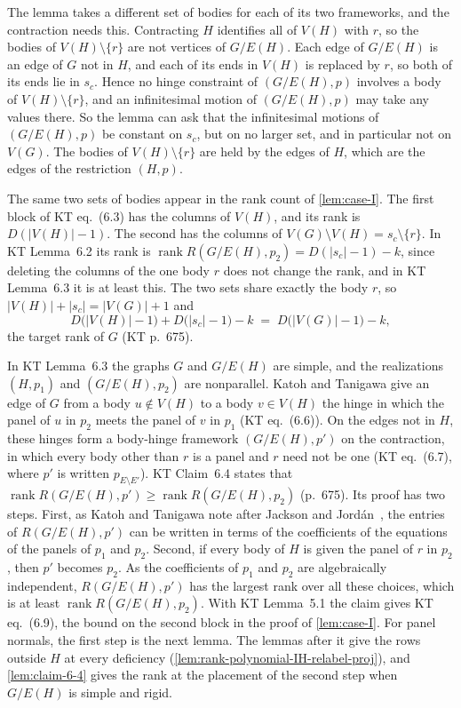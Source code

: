 The lemma takes a different set of bodies for each of its two
frameworks, and the contraction needs this. Contracting $H$ identifies
all of $V(H)$ with $r$, so the bodies of $V(H) \setminus \{r\}$ are not
vertices of $G/E(H)$. Each edge of $G/E(H)$ is an edge of $G$ not in
$H$, and each of its ends in $V(H)$ is replaced by $r$, so both of its
ends lie in $s_c$. Hence no hinge constraint of $(G/E(H), p)$ involves a
body of $V(H) \setminus \{r\}$, and an infinitesimal motion of
$(G/E(H), p)$ may take any values there. So the lemma can ask that the
infinitesimal motions of $(G/E(H), p)$ be constant on $s_c$, but on no
larger set, and in particular not on $V(G)$. The bodies of
$V(H) \setminus \{r\}$ are held by the edges of $H$, which are the
edges of the restriction $(H, p)$.

The same two sets of bodies appear in the rank count of
\cref{lem:case-I}. The first block of KT eq.~(6.3) has the columns of
$V(H)$, and its rank is $D(|V(H)| - 1)$. The second has the columns of
$V(G) \setminus V(H) = s_c \setminus \{r\}$. In KT Lemma~6.2 its rank
is $\operatorname{rank} R(G/E(H), p_2) = D(|s_c| - 1) - k$, since
deleting the columns of the one body $r$ does not change the rank, and
in KT Lemma~6.3 it is at least this. The two sets share exactly the body
$r$, so
$|V(H)| + |s_c| = |V(G)| + 1$ and
\[
  D\bigl(|V(H)| - 1\bigr) + D\bigl(|s_c| - 1\bigr) - k
  \;=\; D\bigl(|V(G)| - 1\bigr) - k,
\]
the target rank of $G$ (KT p.~675).

In KT Lemma~6.3 the graphs $G$ and $G/E(H)$ are simple, and the
realizations $(H, p_1)$ and $(G/E(H), p_2)$ are nonparallel. Katoh and
Tanigawa give an edge of $G$ from a body $u \notin V(H)$ to a body
$v \in V(H)$ the hinge in which the panel of $u$ in $p_2$ meets the panel
of $v$ in $p_1$ (KT eq.~(6.6)). On the edges not in $H$, these hinges
form a body-hinge framework $(G/E(H), p')$ on the contraction, in which
every body other than $r$ is a panel and $r$ need not be one (KT
eq.~(6.7), where $p'$ is written $p_{E \setminus E'}$). KT Claim~6.4
states that
$\operatorname{rank} R(G/E(H), p') \ge \operatorname{rank} R(G/E(H), p_2)$
(p.~675). Its proof has two steps. First, as Katoh and Tanigawa note
after Jackson and Jord\'an~\cite{jacksonJordan2009}, the entries of
$R(G/E(H), p')$ can be written in terms of the coefficients of the
equations of the panels of $p_1$ and $p_2$. Second, if every body of $H$
is given the panel of $r$ in $p_2$, then $p'$ becomes $p_2$. As the
coefficients of $p_1$ and $p_2$ are algebraically independent,
$R(G/E(H), p')$ has the largest rank over all these choices, which is at
least $\operatorname{rank} R(G/E(H), p_2)$. With KT Lemma~5.1 the claim
gives KT eq.~(6.9), the bound on the second block in the proof of
\cref{lem:case-I}. For panel normals, the first step is the next lemma.
The lemmas after it give the rows outside $H$ at every deficiency
(\cref{lem:rank-polynomial-IH-relabel-proj}), and \cref{lem:claim-6-4}
gives the rank at the placement of the second step when $G/E(H)$ is
simple and rigid.

